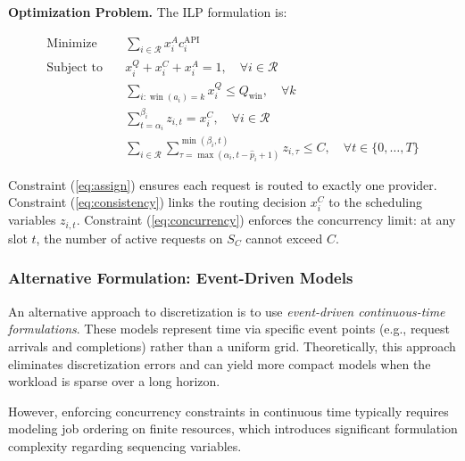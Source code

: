 \documentclass[11pt]{article}
\begin{document}
\textbf{Optimization Problem.} The ILP formulation is:

\begin{align}
    \text{Minimize} \quad & \sum_{i \in \mathcal{R}} x_i^A c_i^{\text{API}} \label{eq:obj} \\
    \text{Subject to} \quad & x_i^Q + x_i^C + x_i^A = 1, \quad \forall i \in \mathcal{R} \label{eq:assign} \\
    & \sum_{i: \operatorname{win}(a_i)=k} x_i^Q \le Q_{\text{win}}, \quad \forall k \label{eq:quota} \\
    & \sum_{t=\alpha_i}^{\beta_i} z_{i,t} = x_i^C, \quad \forall i \in \mathcal{R} \label{eq:consistency} \\
    & \sum_{i \in \mathcal{R}} \sum_{\tau=\max(\alpha_i, t-\hat{p}_i+1)}^{\min(\beta_i, t)} z_{i,\tau} \le C, \quad \forall t \in \{0, \dots, T\} \label{eq:concurrency}
\end{align}

Constraint (\ref{eq:assign}) ensures each request is routed to exactly one provider. Constraint (\ref{eq:consistency}) links the routing decision $x_i^C$ to the scheduling variables $z_{i,t}$. Constraint (\ref{eq:concurrency}) enforces the concurrency limit: at any slot $t$, the number of active requests on $S_C$ cannot exceed $C$.
\subsubsection{Alternative Formulation: Event-Driven Models}

An alternative approach to discretization is to use \textit{event-driven continuous-time formulations}. These models represent time via specific event points (e.g., request arrivals and completions) rather than a uniform grid. Theoretically, this approach eliminates discretization errors and can yield more compact models when the workload is sparse over a long horizon.

However, enforcing concurrency constraints in continuous time typically requires modeling job ordering on finite resources, which introduces significant formulation complexity regarding sequencing variables.
\end{document}
